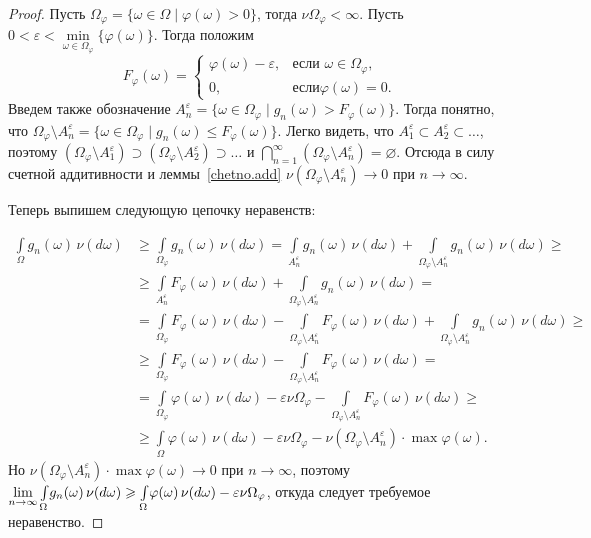 \documentclass[12pt,titlepage]{article}
\theoremstyle{definition}
\newcommand*{\p}[1]{#1\nobreak\discretionary{}{\hbox{$\mathsurround=0pt #1$}}{}}
\begin{document}
\begin{proof}
Пусть $\Omega_\varphi=\{\omega\in\Omega\mid \varphi(\omega)>0\}$,
тогда $\nu\Omega_\varphi<\infty$. Пусть
$0<\varepsilon<\min\limits_{\omega\in\Omega_\varphi}\{\varphi(\omega)\}$.
Тогда положим
$$F_\varphi(\omega)=\begin{cases}\varphi(\omega)-\varepsilon,&
\text{если $\omega\in\Omega_\varphi$,}\\ 0,& \text{если
$\varphi(\omega)=0$}.
\end{cases}$$
Введем также обозначение
$A_n^\varepsilon=\{\omega\in\Omega_\varphi\mid
g_n(\omega)>F_\varphi(\omega)\}$. Тогда понятно, что
$\Omega_\varphi\setminus
A_n^\varepsilon=\{\omega\in\Omega_\varphi\mid g_n(\omega)\leqslant
F_\varphi(\omega)\}$. Легко видеть, что $A_1^\varepsilon\subset
A_2^\varepsilon\subset\ldots$, поэтому $(\Omega_\varphi\setminus
A_1^\varepsilon)\supset (\Omega_\varphi\setminus
A_2^\varepsilon)\supset\ldots$ и $\bigcap\limits_{n=1}^\infty
(\Omega_\varphi\setminus A_n^\varepsilon)=\varnothing$. Отсюда в
силу счетной аддитивности и леммы~\ref{chetno.add}
$\nu(\Omega_\varphi\setminus A_n^\varepsilon)\to 0$ при
$n\to\infty$.

Теперь выпишем следующую цепочку неравенств:

\begin{align*}
\int\limits_\Omega\! g_n(\omega)\,\nu(d\omega)&\geqslant
\int\limits_{\Omega_\varphi}\! g_n(\omega)\,\nu(d\omega)=
\int\limits_{A_n^\varepsilon}\! g_n(\omega)\,\nu(d\omega) +
\int\limits_{\Omega_\varphi\setminus A_n^\varepsilon}\!
g_n(\omega)\,\nu(d\omega)\geqslant\\
&\geqslant\int\limits_{A_n^\varepsilon}\!
F_\varphi(\omega)\,\nu(d\omega) +
\int\limits_{\Omega_\varphi\setminus A_n^\varepsilon}\!
g_n(\omega)\,\nu(d\omega)=\\
&= \int\limits_{\Omega_\varphi}\! F_\varphi(\omega)\,\nu(d\omega)-
\int\limits_{\Omega_\varphi\setminus A_n^\varepsilon}\!
F_\varphi(\omega)\,\nu(d\omega)+\int\limits_{\Omega_\varphi\setminus
A_n^\varepsilon}\! g_n(\omega)\,\nu(d\omega)\geqslant\\
&\geqslant \int\limits_{\Omega_\varphi}\!
F_\varphi(\omega)\,\nu(d\omega)-\int\limits_{\Omega_\varphi\setminus
A_n^\varepsilon}\! F_\varphi(\omega)\,\nu(d\omega)=\\
&= \int\limits_{\Omega_\varphi}\!
\varphi(\omega)\,\nu(d\omega)-\varepsilon\nu\Omega_\varphi-
\int\limits_{\Omega_\varphi\setminus A_n^\varepsilon}\!
F_\varphi(\omega)\,\nu(d\omega)\geqslant\\
&\geqslant \int\limits_\Omega\!
\varphi(\omega)\,\nu(d\omega)-\varepsilon\nu\Omega_\varphi
-\nu(\Omega_\varphi\setminus A_n^\varepsilon)\cdot \max
\varphi(\omega).
\end{align*}
Но $\nu(\Omega_\varphi\setminus A_n^\varepsilon)\cdot\max
\varphi(\omega)\to 0$ при $n\to\infty$, поэтому
$\lim\limits_{n\to\infty}\int\limits_\Omega\!
g_n(\omega)\,\nu(d\omega)\p\geqslant \int\limits_\Omega\!
\varphi(\omega)\,\nu(d\omega)-\varepsilon\nu\Omega_\varphi$, откуда
следует требуемое неравенство.
\end{proof}
\end{document}
